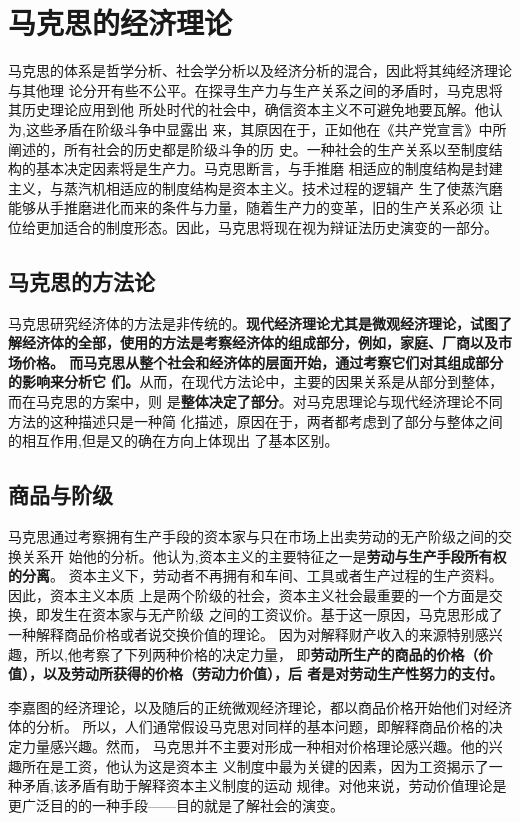 \section{马克思的经济理论}

马克思的体系是哲学分析、社会学分析以及经济分析的混合，因此将其纯经济理论与其他理
论分开有些不公平。在探寻生产力与生产关系之间的矛盾时，马克思将其历史理论应用到他
所处时代的社会中，确信资本主义不可避免地要瓦解。他认为,这些矛盾在阶级斗争中显露出
来，其原因在于，正如他在《共产党宣言》中所阐述的，所有社会的历史都是阶级斗争的历
史。一种社会的生产关系以至制度结构的基本决定因素将是生产力。马克思断言，与手推磨
相适应的制度结构是封建主义，与蒸汽机相适应的制度结构是资本主义。技术过程的逻辑产
生了使蒸汽磨能够从手推磨进化而来的条件与力量，随着生产力的变革，旧的生产关系必须
让位给更加适合的制度形态。因此，马克思将现在视为辩证法历史演变的一部分。

\subsection{马克思的方法论}

马克思研究经济体的方法是非传统的。\textbf{现代经济理论尤其是微观经济理论，试图了
  解经济体的全部，使用的方法是考察经济体的组成部分，例如，家庭、厂商以及市场价格。
  而马克思从整个社会和经济体的层面开始，通过考察它们对其组成部分的影响来分析它
  们。}从而，在现代方法论中，主要的因果关系是从部分到整体，而在马克思的方案中，则
是\textbf{整体决定了部分}。对马克思理论与现代经济理论不同方法的这种描述只是一种简
化描述，原因在于，两者都考虑到了部分与整体之间的相互作用,但是又的确在方向上体现出
了基本区别。

\subsection{商品与阶级}

马克思通过考察拥有生产手段的资本家与只在市场上出卖劳动的无产阶级之间的交换关系开
始他的分析。他认为,资本主义的主要特征之一是\textbf{劳动与生产手段所有权的分离}。
资本主义下，劳动者不再拥有和车间、工具或者生产过程的生产资料。因此，资本主义本质
上是两个阶级的社会，资本主义社会最重要的一个方面是交换，即发生在资本家与无产阶级
之间的工资议价。基于这一原因，马克思形成了一种解释商品价格或者说交换价值的理论。
因为对解释财产收入的来源特别感兴趣，所以,他考察了下列两种价格的决定力量，
即\textbf{劳动所生产的商品的价格（价值），以及劳动所获得的价格（劳动力价值），后
  者是对劳动生产性努力的支付。}

李嘉图的经济理论，以及随后的正统微观经济理论，都以商品价格开始他们对经济体的分析。
所以，人们通常假设马克思对同样的基本问题，即解释商品价格的决定力量感兴趣。然而，
马克思并不主要对形成一种相对价格理论感兴趣。他的兴趣所在是工资，他认为这是资本主
义制度中最为关键的因素，因为工资揭示了一种矛盾,该矛盾有助于解释资本主义制度的运动
规律。对他来说，劳动价值理论是更广泛目的的一种手段——目的就是了解社会的演变。

